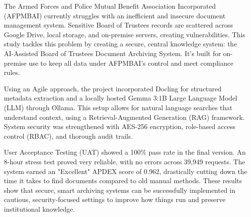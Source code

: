 
\begin{abstractwithpageno}	
The Armed Forces and Police Mutual Benefit Association Incorporated (AFPMBAI) currently struggles with an inefficient and insecure document management system. Sensitive Board of Trustees records are scattered across Google Drive, local storage, and on-premise servers, creating vulnerabilities. This study tackles this problem by creating a secure, central knowledge system: the AI-Assisted Board of Trustees Document Archiving System. It's built for on-premise use to keep all data under AFPMBAI's control and meet compliance rules.

Using an Agile approach, the project incorporated Docling for structured metadata extraction and a locally hosted Gemma 3:1B Large Language Model (LLM) through Ollama. This setup allows for natural language searches that understand context, using a Retrieval-Augmented Generation (RAG) framework. System security was strengthened with AES-256 encryption, role-based access control (RBAC), and thorough audit trails.

User Acceptance Testing (UAT) showed a 100\% pass rate in the final version. An 8-hour stress test proved very reliable, with no errors across 39,949 requests. The system earned an "Excellent" APDEX score of 0.962, drastically cutting down the time it takes to find documents compared to old manual methods. These results show that secure, smart archiving systems can be successfully implemented in cautious, security-focused settings to improve how things run and preserve institutional knowledge.
\end{abstractwithpageno}